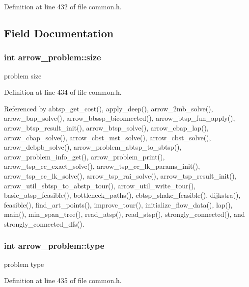Definition at line 432 of file common.h.

\subsection{Field Documentation}
\hypertarget{structarrow__problem_de8573ddc391d06b08b65923fca693ec}{
\subsubsection{\setlength{\rightskip}{0pt plus 5cm}int {\bf arrow\_\-problem::size}}}
\label{structarrow__problem_de8573ddc391d06b08b65923fca693ec}


problem size 

Definition at line 434 of file common.h.

Referenced by abtsp\_\-get\_\-cost(), apply\_\-deep(), arrow\_\-2mb\_\-solve(), arrow\_\-bap\_\-solve(), arrow\_\-bbssp\_\-biconnected(), arrow\_\-btsp\_\-fun\_\-apply(), arrow\_\-btsp\_\-result\_\-init(), arrow\_\-btsp\_\-solve(), arrow\_\-cbap\_\-lap(), arrow\_\-cbap\_\-solve(), arrow\_\-cbst\_\-mst\_\-solve(), arrow\_\-cbst\_\-solve(), arrow\_\-dcbpb\_\-solve(), arrow\_\-problem\_\-abtsp\_\-to\_\-sbtsp(), arrow\_\-problem\_\-info\_\-get(), arrow\_\-problem\_\-print(), arrow\_\-tsp\_\-cc\_\-exact\_\-solve(), arrow\_\-tsp\_\-cc\_\-lk\_\-params\_\-init(), arrow\_\-tsp\_\-cc\_\-lk\_\-solve(), arrow\_\-tsp\_\-rai\_\-solve(), arrow\_\-tsp\_\-result\_\-init(), arrow\_\-util\_\-sbtsp\_\-to\_\-abstp\_\-tour(), arrow\_\-util\_\-write\_\-tour(), basic\_\-atsp\_\-feasible(), bottleneck\_\-paths(), cbtsp\_\-shake\_\-feasible(), dijkstra(), feasible(), find\_\-art\_\-points(), improve\_\-tour(), initialize\_\-flow\_\-data(), lap(), main(), min\_\-span\_\-tree(), read\_\-atsp(), read\_\-stsp(), strongly\_\-connected(), and strongly\_\-connected\_\-dfs().\hypertarget{structarrow__problem_42c44f8d75c6e7a1c7440ac472b8594b}{
\subsubsection{\setlength{\rightskip}{0pt plus 5cm}int {\bf arrow\_\-problem::type}}}
\label{structarrow__problem_42c44f8d75c6e7a1c7440ac472b8594b}


problem type 

Definition at line 435 of file common.h.

